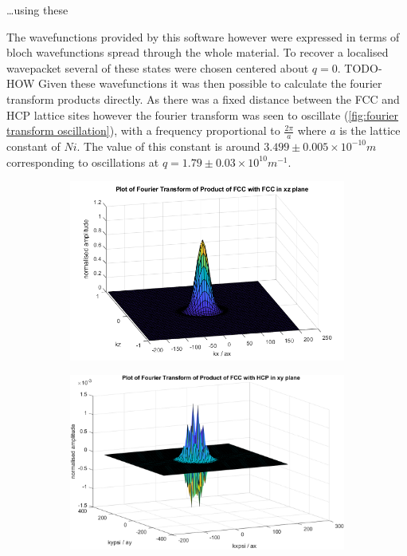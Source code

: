 \ldots using these

The wavefunctions provided by this software however
were expressed in terms of bloch wavefunctions spread
through the whole material.
To recover a localised
wavepacket several of these states were chosen
centered about \(q=0\).
TODO-HOW
Given these wavefunctions
it was then possible to calculate the fourier
transform products directly. As there was a fixed
distance between the FCC and HCP lattice
sites however the fourier transform was seen to
oscillate (\cref{fig:fourier transform oscillation}), with a frequency proportional to
\(\frac{2\pi}{a}\) where \(a\) is the lattice
constant of \(Ni\). The value of this constant
is around \(3.499\pm{}0.005\times{}10^{-10}m\)~\cite{PhysRev.25.753}
corresponding to oscillations at
\(q = 1.79 \pm 0.03 \times{}10^{10}m^{-1}\).
\begin{figure}[htbp]
    \centering
    \begin{subfigure}{0.45\linewidth}
        \centering
        \includegraphics[width= 0.9\linewidth]{Figures/Model/Plot of fourier transform of the wavefunction fccfcc xz plane.png}
        \label{fig:diagonal hydrogen matrix element no oscillation}
    \end{subfigure}
    \hfill
    \begin{subfigure}{0.45\linewidth}
        \centering
        \includegraphics[width= 0.9\linewidth]{Figures/Model/Plot of fourier transform of the wavefunction.png}

\end{subfigure}
\end{figure}
